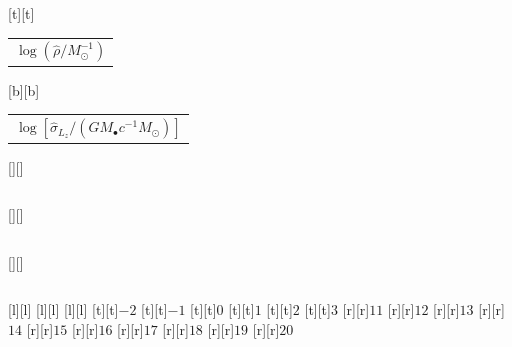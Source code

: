 %    
%
%
\begin{psfrags}%
\psfragscanon%
%
[t][t]{\color[rgb]{0,0,0}\setlength{\tabcolsep}{0pt}\begin{tabular}{c}{\Large$\log\left(\hat{\rho}/M_\odot^{-1}\right)$}\end{tabular}}%
[b][b]{\color[rgb]{0,0,0}\setlength{\tabcolsep}{0pt}\begin{tabular}{c}{\Large$\log\left[\hat{\sigma}_{L_z}/\left(G M_\bullet c^{-1} M_\odot\right)\right]$}\end{tabular}}%
[][]{\color[rgb]{0,0,0}\setlength{\tabcolsep}{0pt}\begin{tabular}{c} \end{tabular}}%
[][]{\color[rgb]{0,0,0}\setlength{\tabcolsep}{0pt}\begin{tabular}{c} \end{tabular}}%
[][]{\color[rgb]{0,0,0}\setlength{\tabcolsep}{0pt}\begin{tabular}{c} \end{tabular}}%
[l][l]{\color[rgb]{0,0,0}{\large$\iota = \pi/12$}}%
[l][l]{\color[rgb]{0,0,0}{\large$\iota = \pi/4$}}%
[l][l]{\color[rgb]{0,0,0}{\large$\iota = 5\pi/12$}}%
%
[t][t]{$-2$}%
[t][t]{$-1$}%
[t][t]{$0$}%
[t][t]{$1$}%
[t][t]{$2$}%
[t][t]{$3$}%
%
[r][r]{$11$}%
[r][r]{$12$}%
[r][r]{$13$}%
[r][r]{$14$}%
[r][r]{$15$}%
[r][r]{$16$}%
[r][r]{$17$}%
[r][r]{$18$}%
[r][r]{$19$}%
[r][r]{$20$}%
%
%
\end{psfrags}%
%
